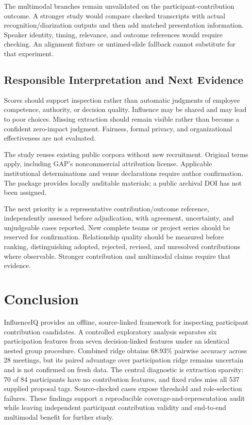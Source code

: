 \documentclass[journal]{IEEEtran}
\begin{document}
The multimodal branches remain unvalidated on the participant-contribution outcome. A stronger study would compare checked transcripts with actual recognition/diarization outputs and then add matched presentation information. Speaker identity, timing, relevance, and outcome references would require checking. An alignment fixture or untimed-slide fallback cannot substitute for that experiment.

\subsection{Responsible Interpretation and Next Evidence}
Scores should support inspection rather than automatic judgments of employee competence, authority, or decision quality. Influence may be shared and may lead to poor choices. Missing extraction should remain visible rather than become a confident zero-impact judgment. Fairness, formal privacy, and organizational effectiveness are not evaluated.

The study reuses existing public corpora without new recruitment. Original terms apply, including GAP's noncommercial attribution license. Applicable institutional determinations and venue declarations require author confirmation. The package provides locally auditable materials; a public archival DOI has not been assigned.

The next priority is a representative contribution/outcome reference, independently assessed before adjudication, with agreement, uncertainty, and unjudgeable cases reported. New complete teams or project series should be reserved for confirmation. Relationship quality should be measured before ranking, distinguishing adopted, rejected, revised, and unresolved contributions where observable. Stronger contribution and multimodal claims require that evidence.

\section{Conclusion}
InfluenceIQ provides an offline, source-linked framework for inspecting participant contribution candidates. A controlled exploratory analysis separates six participation features from seven decision-linked features under an identical nested group procedure. Combined ridge obtains 68.93\% pairwise accuracy across 28 meetings, but its paired advantage over participation ridge remains uncertain and is not confirmed on fresh data. The central diagnostic is extraction sparsity: 70 of 84 participants have no contribution features, and fixed rules miss all 537 supplied proposal tags. Source-checked cases expose threshold and role-selection failures. These findings support a reproducible coverage-and-representation audit while leaving independent participant contribution validity and end-to-end multimodal benefit for further study.
\end{document}

